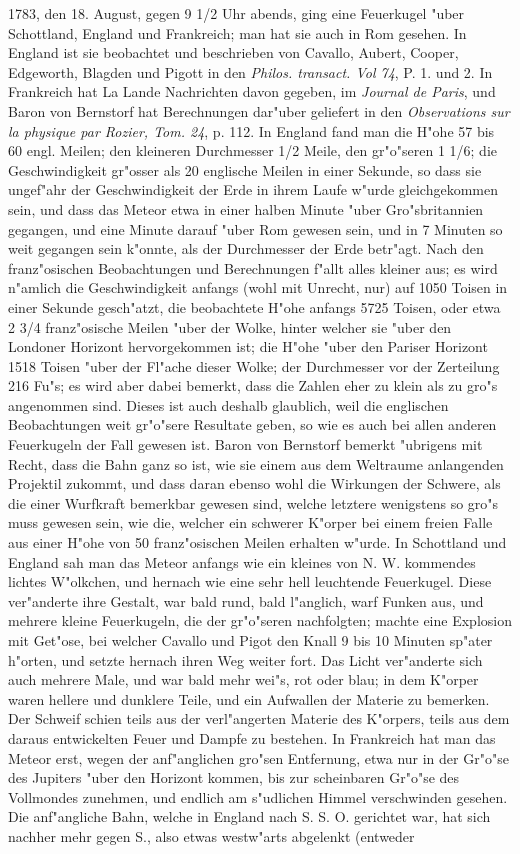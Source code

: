 \documentclass[a4paper, 11pt, oneside, polutonikogreek, german]{article}
\begin{document}
1783, den 18. August, gegen 9 1/2 Uhr abends, ging eine Feuerkugel "uber Schottland, England und Frankreich; man hat sie auch in Rom gesehen. In England ist sie beobachtet und beschrieben von Cavallo, Aubert, Cooper, Edgeworth, Blagden und Pigott in den \emph{Philos. transact. Vol 74}, P. 1. und 2. In Frankreich hat La Lande Nachrichten davon gegeben, im \emph{Journal de Paris}, und Baron von Bernstorf hat Berechnungen dar"uber geliefert in den \emph{Observations sur la physique par Rozier, Tom. 24}, p. 112. In England fand man die H"ohe 57 bis 60 engl. Meilen; den kleineren Durchmesser 1/2 Meile, den gr"o"seren 1 1/6; die Geschwindigkeit gr"osser als 20 englische Meilen in einer Sekunde, so dass sie ungef"ahr der Geschwindigkeit der Erde in ihrem Laufe w"urde gleichgekommen sein, und dass das Meteor etwa in einer halben Minute "uber Gro"sbritannien gegangen, und eine Minute darauf "uber Rom gewesen sein, und in 7 Minuten so weit gegangen sein k"onnte, als der Durchmesser der Erde betr"agt. Nach den franz"osischen Beobachtungen und Berechnungen f"allt alles kleiner aus; es wird n"amlich die Geschwindigkeit anfangs (wohl mit Unrecht, nur) auf 1050 Toisen in einer Sekunde gesch"atzt, die beobachtete H"ohe anfangs 5725 Toisen, oder etwa 2 3/4 franz"osische Meilen "uber der Wolke, hinter welcher sie "uber den Londoner Horizont hervorgekommen ist; die H"ohe "uber den Pariser Horizont 1518 Toisen "uber der Fl"ache dieser Wolke; der Durchmesser vor der Zerteilung 216 Fu"s; es wird aber dabei bemerkt, dass die Zahlen eher zu klein als zu gro"s angenommen sind. Dieses ist auch deshalb glaublich, weil die englischen Beobachtungen weit gr"o"sere Resultate geben, so wie es auch bei allen anderen Feuerkugeln der Fall gewesen ist. Baron von Bernstorf bemerkt "ubrigens mit Recht, dass die Bahn ganz so ist, wie sie einem aus dem Weltraume anlangenden Projektil zukommt, und dass daran ebenso wohl die Wirkungen der Schwere, als die einer Wurfkraft bemerkbar gewesen sind, welche letztere wenigstens so gro"s muss gewesen sein, wie die, welcher ein schwerer K"orper bei einem freien Falle aus einer H"ohe von 50 franz"osischen Meilen erhalten w"urde. In Schottland und England sah man das Meteor anfangs wie ein kleines von N. W. kommendes lichtes W"olkchen, und hernach wie eine sehr hell leuchtende Feuerkugel. Diese ver"anderte ihre Gestalt, war bald rund, bald l"anglich, warf Funken aus, und mehrere kleine Feuerkugeln, die der gr"o"seren nachfolgten; machte eine Explosion mit Get"ose, bei welcher Cavallo und Pigot den Knall 9 bis 10 Minuten sp"ater h"orten, und setzte hernach ihren Weg weiter fort. Das Licht ver"anderte sich auch mehrere Male, und war bald mehr wei"s, rot oder blau; in dem K"orper waren hellere und dunklere Teile, und ein Aufwallen der Materie zu bemerken. Der Schweif schien teils aus der verl"angerten Materie des K"orpers, teils aus dem daraus entwickelten Feuer und Dampfe zu bestehen. In Frankreich hat man das Meteor erst, wegen der anf"anglichen gro"sen Entfernung, etwa nur in der Gr"o"se des Jupiters "uber den Horizont kommen, bis zur scheinbaren Gr"o"se des Vollmondes zunehmen, und endlich am s"udlichen Himmel verschwinden gesehen. Die anf"angliche Bahn, welche in England nach S. S. O. gerichtet war, hat sich nachher mehr gegen S., also etwas westw"arts abgelenkt (entweder 
\end{document}
